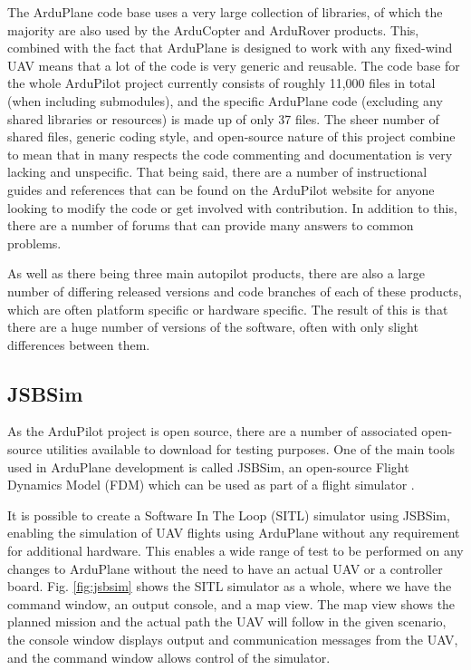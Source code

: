 The ArduPlane code base uses a very large collection of libraries, of which the majority are also used by the ArduCopter and ArduRover products. This, combined with the fact that ArduPlane is designed to work with any fixed-wind UAV means that a lot of the code is very generic and reusable. The code base for the whole ArduPilot project currently consists of roughly 11,000 files in total (when including submodules), and the specific ArduPlane code (excluding any shared libraries or resources) is made up of only 37 files. The sheer number of shared files, generic coding style, and open-source nature of this project combine to mean that in many respects the code commenting and documentation is very lacking and unspecific. That being said, there are a number of instructional guides and references that can be found on the ArduPilot website for anyone looking to modify the code or get involved with contribution. In addition to this, there are a number of forums that can provide many answers to common problems. 

As well as there being three main autopilot products, there are also a large number of differing released versions and code branches of each of these products, which are often platform specific or hardware specific. The result of this is that there are a huge number of versions of the software, often with only slight differences between them.


\subsection{JSBSim}
\label{intro:jsbsim}

As the ArduPilot project is open source, there are a number of associated open-source utilities available to download for testing purposes. One of the main tools used in ArduPlane development is called JSBSim, an open-source Flight Dynamics Model (FDM) which can be used as part of a flight simulator \cite{jsbsim}. 

It is possible to create a Software In The Loop (SITL) simulator using JSBSim, enabling the simulation of UAV flights using ArduPlane without any requirement for additional hardware. This enables a wide range of test to be performed on any changes to ArduPlane without the need to have an actual UAV or a controller board. Fig. \ref{fig:jsbsim} shows the SITL simulator as a whole, where we have the command window, an output console, and a map view. The map view shows the planned mission and the actual path the UAV will follow in the given scenario, the console window displays output and communication messages from the UAV, and the command window allows control of the simulator.

